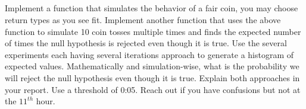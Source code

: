 \documentclass[answers]{exam}
\begin{document}
\subsection{} Implement a function that simulates the behavior of a fair coin, you may choose return types as you see fit. Implement another function that uses the above function to simulate 10 coin tosses multiple times and finds the expected number of times the null hypothesis is rejected even though it is true. Use the several experiments each having several iterations approach to generate a histogram of expected values. Mathematically and simulation-wise, what is the probability we will reject the null hypothesis even though it is true. Explain both approaches in your report. Use a threshold of 0:05. Reach out if you have confusions but not at the $11^{th}$ hour.
\end{document}

